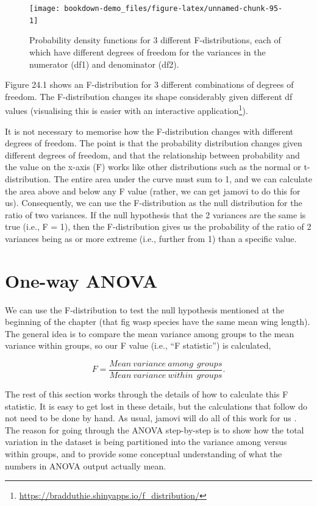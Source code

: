 \documentclass[
  openany]{krantz}
\begin{document}
\begin{figure}
\texttt{[image: bookdown-demo\_files/figure-latex/unnamed-chunk-95-1]} \caption{Probability density functions for 3 different F-distributions, each of which have different degrees of freedom for the variances in the numerator (df1) and denominator (df2).}\label{fig:unnamed-chunk-95}
\end{figure}

Figure 24.1 shows an F-distribution for 3 different combinations of degrees of freedom.
The F-distribution changes its shape considerably given different df values (visualising this is easier with an interactive application\footnote{\url{https://bradduthie.shinyapps.io/f_distribution/}}).

It is not necessary to memorise how the F-distribution changes with different degrees of freedom.
The point is that the probability distribution changes given different degrees of freedom, and that the relationship between probability and the value on the x-axis (F) works like other distributions such as the normal or t-distribution.
The entire area under the curve must sum to 1, and we can calculate the area above and below any F value (rather, we can get jamovi to do this for us).
Consequently, we can use the F-distribution as the null distribution for the ratio of two variances.
If the null hypothesis that the 2 variances are the same is true (i.e., F = 1), then the F-distribution gives us the probability of the ratio of 2 variances being as or more extreme (i.e., further from 1) than a specific value.

\hypertarget{one-way-anova}{%
\section{One-way ANOVA}\label{one-way-anova}}

We can use the F-distribution to test the null hypothesis mentioned at the beginning of the chapter (that fig wasp species have the same mean wing length).
The general idea is to compare the mean variance among groups to the mean variance within groups, so our F value (i.e., ``F statistic'') is calculated,

\[F = \frac{Mean\:variance\:among\:\:groups}{Mean\:variance\:within\:\:groups}.\]

The rest of this section works through the details of how to calculate this F statistic.
It is easy to get lost in these details, but the calculations that follow do not need to be done by hand.
As usual, jamovi will do all of this work for us \citep{Jamovi2022}.
The reason for going through the ANOVA step-by-step is to show how the total variation in the dataset is being partitioned into the variance among versus within groups, and to provide some conceptual understanding of what the numbers in ANOVA output actually mean.
\end{document}
